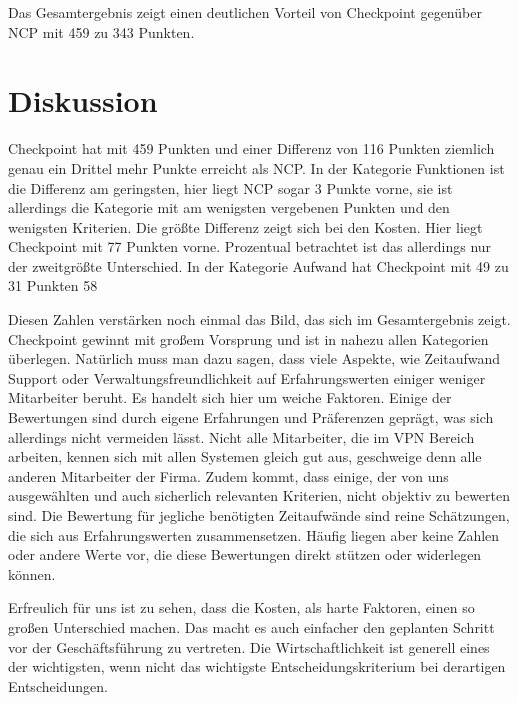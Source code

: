 Das Gesamtergebnis zeigt einen deutlichen Vorteil von Checkpoint gegenüber NCP mit 459 zu 343 Punkten.


\section{Diskussion} %
\label{sec:Diskussion}

Checkpoint hat mit 459 Punkten und einer Differenz von 116 Punkten ziemlich genau ein Drittel mehr Punkte erreicht als NCP. In der Kategorie Funktionen ist die Differenz am geringsten, hier liegt NCP sogar 3 Punkte vorne, sie ist allerdings die Kategorie mit am wenigsten vergebenen Punkten und den wenigsten Kriterien. Die größte Differenz zeigt sich bei den Kosten. Hier liegt Checkpoint mit 77 Punkten vorne. Prozentual betrachtet ist das allerdings nur der zweitgrößte Unterschied. In der Kategorie Aufwand hat Checkpoint mit 49 zu 31 Punkten 58%

Diesen Zahlen verstärken noch einmal das Bild, das sich im Gesamtergebnis zeigt. Checkpoint gewinnt mit großem Vorsprung und ist in nahezu allen Kategorien überlegen. Natürlich muss man dazu sagen, dass viele Aspekte, wie Zeitaufwand Support oder Verwaltungsfreundlichkeit auf Erfahrungswerten einiger weniger Mitarbeiter beruht. Es handelt sich hier um weiche Faktoren. Einige der Bewertungen sind durch eigene Erfahrungen und Präferenzen geprägt, was sich allerdings nicht vermeiden lässt. Nicht alle Mitarbeiter, die im VPN Bereich arbeiten, kennen sich mit allen Systemen gleich gut aus, geschweige denn alle anderen Mitarbeiter der Firma. Zudem kommt, dass einige, der von uns ausgewählten und auch sicherlich relevanten Kriterien, nicht objektiv zu bewerten sind. Die Bewertung für jegliche benötigten Zeitaufwände sind reine Schätzungen, die sich aus Erfahrungswerten zusammensetzen. Häufig liegen aber keine Zahlen oder andere Werte vor, die diese Bewertungen direkt stützen oder widerlegen können. 

Erfreulich für uns ist zu sehen, dass die Kosten, als harte Faktoren, einen so großen Unterschied machen. Das macht es auch einfacher den geplanten Schritt vor der Geschäftsführung zu vertreten. Die Wirtschaftlichkeit ist generell eines der wichtigsten, wenn nicht das wichtigste Entscheidungskriterium bei derartigen Entscheidungen.


